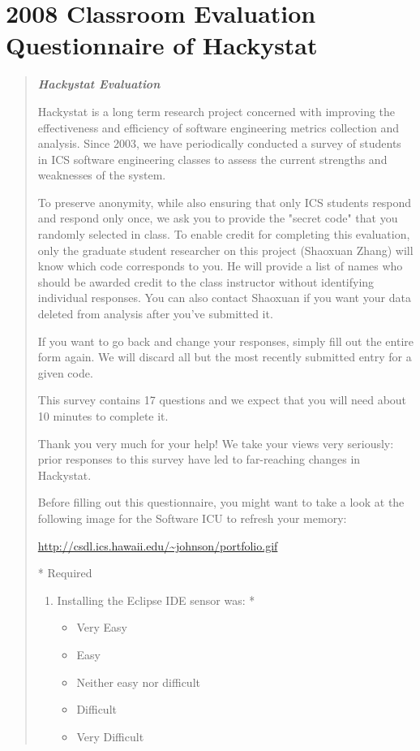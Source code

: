 
\appendix
\chapter{2008 Classroom Evaluation Questionnaire of Hackystat}
\label{appx:survey}
\begin{quote}
\sl
{\bf \em Hackystat Evaluation}

Hackystat is a long term research project concerned with improving the effectiveness and efficiency of software engineering metrics collection and analysis.  Since 2003, we have periodically conducted a survey of students in ICS software engineering classes to assess the current strengths and weaknesses of the system.

To preserve anonymity,  while also ensuring that only ICS students respond and respond only once, we ask you to provide the "secret code" that you randomly selected in class.   To enable credit for completing this evaluation, only the graduate student researcher on this project (Shaoxuan Zhang) will know which code corresponds to you.  He will provide a list of names who should be awarded credit to the class instructor without identifying individual responses.  You can also contact Shaoxuan if you want your data deleted from analysis after you've submitted it.

If you want to go back and change your responses, simply fill out the entire form again.  We will discard all but the most recently submitted entry for a given code.

This survey contains 17 questions and we expect that you will need about 10 minutes to complete it.

Thank you very much for your help!  We take your views very seriously: prior responses to this survey have led to far-reaching changes in Hackystat.

Before filling out this questionnaire, you might want to take a look at the following image for the Software ICU to refresh your memory:

\url{http://csdl.ics.hawaii.edu/~johnson/portfolio.gif}

* Required
\begin{enumerate}

\item Installing the Eclipse IDE sensor was: *
\begin{itemize}
\item Very Easy
\item Easy
\item Neither easy nor difficult
\item Difficult
\item Very Difficult
\end{itemize}


\end{enumerate}
\end{quote}

